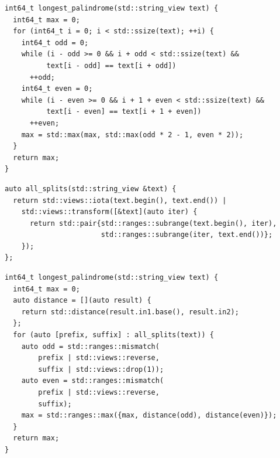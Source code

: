 \documentclass[aspectratio=169]{beamer}
\begin{document}
\begin{frame}[fragile]{}
\begin{verbatim}
int64_t longest_palindrome(std::string_view text) {
  int64_t max = 0;
  for (int64_t i = 0; i < std::ssize(text); ++i) {
    int64_t odd = 0;
    while (i - odd >= 0 && i + odd < std::ssize(text) &&
          text[i - odd] == text[i + odd])
      ++odd;
    int64_t even = 0;
    while (i - even >= 0 && i + 1 + even < std::ssize(text) &&
          text[i - even] == text[i + 1 + even])
      ++even;
    max = std::max(max, std::max(odd * 2 - 1, even * 2));
  }
  return max;
}
\end{verbatim}
\end{frame}

\begin{frame}[fragile]{}
\begin{verbatim}
auto all_splits(std::string_view &text) {
  return std::views::iota(text.begin(), text.end()) |
    std::views::transform([&text](auto iter) {
      return std::pair{std::ranges::subrange(text.begin(), iter),
                       std::ranges::subrange(iter, text.end())};
    });
};
\end{verbatim}
\end{frame}

\begin{frame}[fragile]{}
\begin{verbatim}
int64_t longest_palindrome(std::string_view text) {
  int64_t max = 0;
  auto distance = [](auto result) {
    return std::distance(result.in1.base(), result.in2);
  };
  for (auto [prefix, suffix] : all_splits(text)) {
    auto odd = std::ranges::mismatch(
        prefix | std::views::reverse,
        suffix | std::views::drop(1));
    auto even = std::ranges::mismatch(
        prefix | std::views::reverse,
        suffix);
    max = std::ranges::max({max, distance(odd), distance(even)});
  }
  return max;
}
\end{verbatim}
\end{frame}
\end{document}
